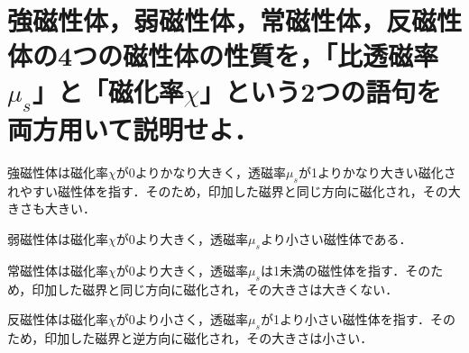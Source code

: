 \documentclass[dvipdfmx]{ujarticle}
\begin{document}
\section{強磁性体，弱磁性体，常磁性体，反磁性体の4つの磁性体の性質を，「比透磁率$\mu_{s}$」と「磁化率$\chi$」という2つの語句を両方用いて説明せよ．}
強磁性体は磁化率$\chi$が0よりかなり大きく，透磁率$\mu_{s}$が1よりかなり大きい磁化されやすい磁性体を指す．そのため，印加した磁界と同じ方向に磁化され，その大きさも大きい．

弱磁性体は磁化率$\chi$が0より大きく，透磁率$\mu_{s}$より小さい磁性体である．

常磁性体は磁化率$\chi$が0より大きく，透磁率$\mu_{s}$は1未満の磁性体を指す．そのため，印加した磁界と同じ方向に磁化され，その大きさは大きくない．

反磁性体は磁化率$\chi$が0より小さく，透磁率$\mu_{s}$が1より小さい磁性体を指す．そのため，印加した磁界と逆方向に磁化され，その大きさは小さい．
\end{document}
